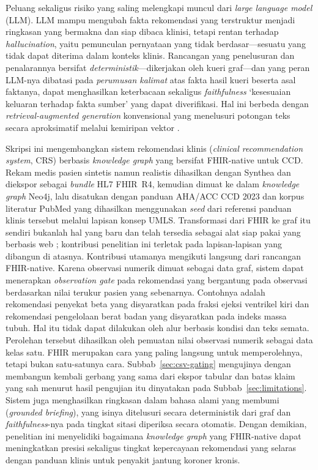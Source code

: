 Peluang sekaligus risiko yang saling melengkapi muncul dari \emph{large language model} (LLM). LLM mampu mengubah fakta rekomendasi yang
terstruktur menjadi ringkasan yang bermakna dan siap dibaca klinisi, tetapi rentan
terhadap \emph{hallucination}, yaitu pemunculan pernyataan yang tidak berdasar---sesuatu
yang tidak dapat diterima dalam konteks klinis. Rancangan yang penelusuran dan penalarannya bersifat \emph{deterministik}---dikerjakan
oleh kueri graf---dan yang peran LLM-nya dibatasi pada \emph{perumusan kalimat} atas
fakta hasil kueri beserta asal faktanya, dapat menghasilkan keterbacaan sekaligus
\emph{faithfulness} `kesesuaian keluaran terhadap fakta sumber' yang dapat diverifikasi. Hal ini berbeda dengan
\emph{retrieval-augmented generation} konvensional yang menelusuri potongan teks secara
aproksimatif melalui kemiripan vektor \cite{rag_lewis2020}.

Skripsi ini mengembangkan sistem rekomendasi klinis (\emph{clinical recommendation system}, CRS) berbasis \emph{knowledge graph}
yang bersifat FHIR-native untuk CCD. Rekam medis pasien sintetis namun realistis
dihasilkan dengan Synthea \cite{synthea} dan diekspor sebagai \emph{bundle} HL7 FHIR~R4,
kemudian dimuat ke dalam \emph{knowledge graph} Neo4j, lalu disatukan dengan panduan AHA/ACC CCD
2023 dan korpus literatur PubMed yang dihasilkan menggunakan \emph{seed} dari referensi panduan klinis tersebut melalui lapisan
konsep UMLS. Transformasi dari FHIR ke graf itu sendiri bukanlah hal yang baru dan telah tersedia
sebagai alat siap pakai yang berbasis web \cite{tenasol_viewer}; kontribusi penelitian ini terletak pada
lapisan-lapisan yang dibangun di atasnya. Kontribusi utamanya mengikuti langsung dari
rancangan FHIR-native. Karena observasi numerik dimuat sebagai data graf, sistem dapat
menerapkan \emph{observation gate} pada rekomendasi yang bergantung pada observasi
berdasarkan nilai terukur pasien yang sebenarnya. Contohnya adalah rekomendasi penyekat
beta yang disyaratkan pada fraksi ejeksi ventrikel kiri dan rekomendasi pengelolaan berat
badan yang disyaratkan pada indeks massa tubuh. Hal itu tidak dapat dilakukan oleh alur
berbasis kondisi dan teks semata. Perolehan tersebut dihasilkan oleh pemuatan nilai observasi numerik sebagai data kelas satu. FHIR merupakan cara yang paling langsung untuk memperolehnya, tetapi bukan satu-satunya cara. Subbab~\ref{sec:csv-gating} mengujinya dengan
membangun kembali gerbang yang sama dari ekspor tabular dan batas klaim yang sah menurut hasil
pengujian itu dinyatakan pada Subbab~\ref{sec:limitations}.
Sistem juga menghasilkan ringkasan dalam bahasa alami yang membumi (\emph{grounded briefing}),
yang isinya ditelusuri secara deterministik dari graf dan \emph{faithfulness}-nya pada tingkat sitasi diperiksa secara otomatis. Dengan demikian, penelitian ini menyelidiki bagaimana \emph{knowledge
graph} yang FHIR-native dapat meningkatkan presisi sekaligus tingkat kepercayaan
rekomendasi yang selaras dengan panduan klinis untuk penyakit jantung koroner kronis.

